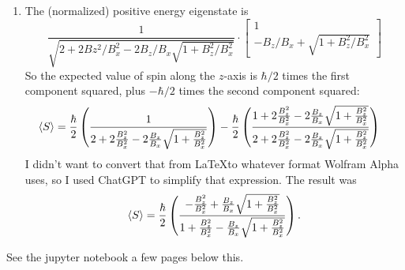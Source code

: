 \documentclass{article}
\begin{document}
\begin{enumerate}[label=(\alph*)]
    \item The (normalized) positive energy eigenstate is
        \[ \frac{1}{\sqrt{2 + 2Bz^2/B_x^2-2B_z/B_x \sqrt{1+B_z^2/B_x^2}}} \cdot \begin{bmatrix}
            1 \\
            -B_z/B_x + \sqrt{1+B_z^2/B_x^2}
        \end{bmatrix} \]
        So the expected value of spin along the $z$-axis is $\hbar/2$ times the first component squared, plus $-\hbar/2$ times the second component squared:
        \begin{align*}
            \left\langle S \right\rangle &= \frac{\hbar}{2} \left( \frac{1}{2+2 \frac{B_z^2}{B_x^2}- 2 \frac{B_z}{B_x} \sqrt{1+ \frac{B_z^2}{B_x^2}}} \right) - \frac{\hbar}{2} \left( \frac{ 1 + 2\frac{B_z^2}{B_x^2} - 2 \frac{B_z}{B_x} \sqrt{1 + \frac{B_z^2}{B_x^2}}}{2+2 \frac{B_z^2}{B_x^2}- 2 \frac{B_z}{B_x} \sqrt{1+ \frac{B_z^2}{B_x^2}}} \right) 
        \end{align*}
        I didn't want to convert that from \LaTeX to whatever format Wolfram Alpha uses, so I used ChatGPT to simplify that expression. The result was
        \[ \left\langle S \right\rangle = \frac{\hbar}{2} \left( \frac{- \frac{B_z^2}{B_x^2} + \frac{B_z}{B_x} \sqrt{1 + \frac{B_z^2}{B_x^2}}}{1 + \frac{B_z^2}{B_x^2} - \frac{B_z}{B_x} \sqrt{1 + \frac{B_z^2}{B_x^2}}} \right). \]
\end{enumerate}


\bigskip
\begin{prob}
\end{prob}
See the jupyter notebook a few pages below this.
\end{document}

